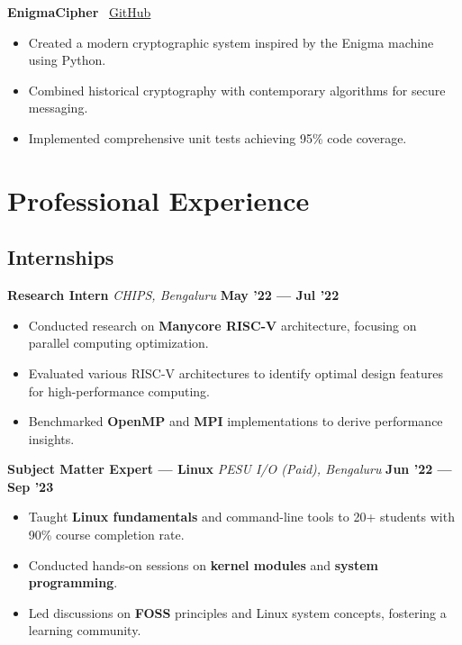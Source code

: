 \documentclass[a4paper,10pt]{article}
\begin{document}
\textbf{EnigmaCipher} \hfill \faGithub~\href{https://github.com/AdarshLiju/enigmacipher}{GitHub}
\begin{itemize}
    \item Created a modern cryptographic system inspired by the Enigma machine using Python.
    \item Combined historical cryptography with contemporary algorithms for secure messaging.
    \item Implemented comprehensive unit tests achieving 95\% code coverage.
\end{itemize}

\section*{Professional Experience}

\subsection*{Internships}

\textbf{Research Intern} \hfill
\textit{CHIPS, Bengaluru} \hfill \textbf{May '22 --- Jul '22}
\begin{itemize}
    \item Conducted research on \textbf{Manycore RISC-V} architecture, focusing on parallel computing optimization.
    \item Evaluated various RISC-V architectures to identify optimal design features for high-performance computing.
    \item Benchmarked \textbf{OpenMP} and \textbf{MPI} implementations to derive performance insights.
\end{itemize}

\vspace{0.5em}

\textbf{Subject Matter Expert --- Linux} \hfill
\textit{PESU I/O (Paid), Bengaluru} \hfill \textbf{Jun '22 --- Sep '23}
\begin{itemize}
    \item Taught \textbf{Linux fundamentals} and command-line tools to 20+ students with 90\% course completion rate.
    \item Conducted hands-on sessions on \textbf{kernel modules} and \textbf{system programming}.
    \item Led discussions on \textbf{FOSS} principles and Linux system concepts, fostering a learning community.
\end{itemize}
\end{document}
